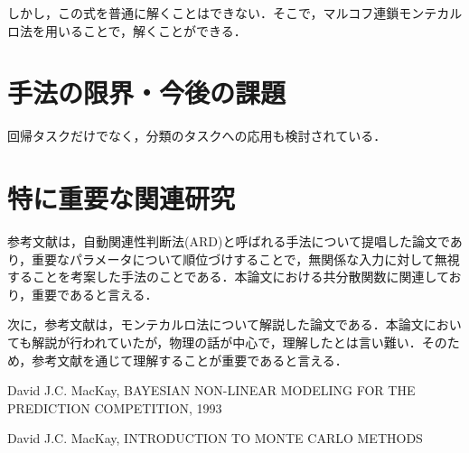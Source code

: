 \documentclass[10pt,onecolumn]{jsarticle}
\begin{document}
しかし，この式を普通に解くことはできない．そこで，マルコフ連鎖モンテカルロ法を用いることで，解くことができる．
\section{手法の限界・今後の課題}
回帰タスクだけでなく，分類のタスクへの応用も検討されている．
\section{特に重要な関連研究}
参考文献\cite{ref1}は，自動関連性判断法(ARD)と呼ばれる手法について提唱した論文であり，重要なパラメータについて順位づけすることで，無関係な入力に対して無視することを考案した手法のことである．本論文における共分散関数に関連しており，重要であると言える．

次に，参考文献\cite{ref2}は，モンテカルロ法について解説した論文である．本論文においても解説が行われていたが，物理の話が中心で，理解したとは言い難い．そのため，参考文献\cite{ref2}を通じて理解することが重要であると言える．

\begin{thebibliography}{99}
%

David J.C. MacKay, BAYESIAN NON-LINEAR MODELING FOR THE PREDICTION COMPETITION, 1993

David J.C. MacKay, INTRODUCTION TO MONTE CARLO METHODS
%
\end{thebibliography}



\end{document}
